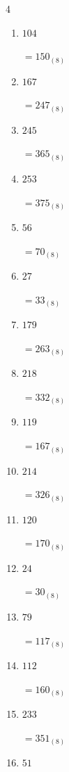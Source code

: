 \begin{multicols}{4}
\begin{enumerate}
        $=4_{(8)}$

  \item $104$

        $=150_{(8)}$

  \item $167$

        $=247_{(8)}$

  \item $245$

        $=365_{(8)}$

  \item $253$

        $=375_{(8)}$

  \item $56$

        $=70_{(8)}$

  \item $27$

        $=33_{(8)}$

  \item $179$

        $=263_{(8)}$

  \item $218$

        $=332_{(8)}$

  \item $119$

        $=167_{(8)}$

  \item $214$

        $=326_{(8)}$

  \item $120$

        $=170_{(8)}$

  \item $24$

        $=30_{(8)}$

  \item $79$

        $=117_{(8)}$

\columnbreak %

\resetques

  \item $112$

        $=160_{(8)}$

  \item $233$

        $=351_{(8)}$

  \item $51$


\end{enumerate}
\end{multicols}
